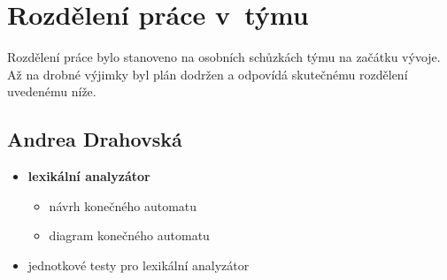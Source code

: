 \documentclass[a4paper, 11pt]{article}
\begin{document}
    \tableofcontents

    \setlength{\parindent}{0cm}
    \setlength{\parskip}{0.45em}
    \renewcommand{\topfraction}{0.95}
    \renewcommand{\bottomfraction}{0.95}
    \renewcommand{\textfraction}{0.05}
    \renewcommand{\floatpagefraction}{0.8}

    \newpage

    \section{Rozdělení práce v~týmu}

    Rozdělení práce bylo stanoveno na osobních schůzkách týmu na začátku vývoje.
    Až na drobné výjimky byl plán dodržen a odpovídá skutečnému rozdělení uvedenému níže.

        \vspace{-0.8em}
        \subsection*{Andrea Drahovská}
        \vspace{-0.5em}
            \begin{itemize}
                \setlength{\itemsep}{-2pt}

                \item \textbf{lexikální analyzátor}
                \begin{itemize}
                    \vspace{-6pt}
                    \item[-] návrh konečného automatu
                    \item[-] diagram konečného automatu
                    \vspace{-4pt}
                \end{itemize}

                \item jednotkové testy pro lexikální analyzátor

            \end{itemize}

        \vspace{-1.4em}
\end{document}
